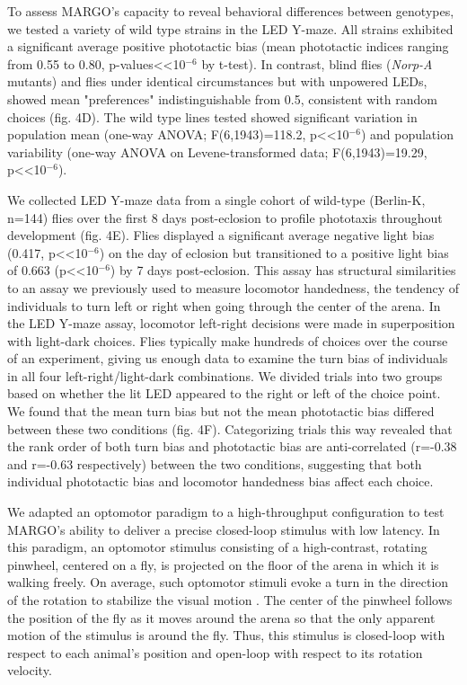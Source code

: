 \documentclass[10pt]{article}
\begin{document}
\begin{multicols}{2}
To assess MARGO's capacity to reveal behavioral differences between genotypes, we tested a variety of wild type strains in the LED Y-maze. All strains exhibited a significant average positive phototactic bias (mean phototactic indices ranging from 0.55 to 0.80, p-values<<10$^{-6}$ by t-test). In contrast, blind flies (\emph{Norp-A} mutants) and flies under identical circumstances but with unpowered LEDs, showed mean "preferences" indistinguishable from 0.5, consistent with random choices (fig. 4D). The wild type lines tested showed significant variation in population mean (one-way ANOVA; F(6,1943)=118.2, p<<10$^{-6}$) and population variability (one-way ANOVA on Levene-transformed data; F(6,1943)=19.29, p<<10$^{-6}$).

We collected LED Y-maze data from a single cohort of wild-type (Berlin-K, n=144) flies over the first 8 days post-eclosion to profile phototaxis throughout development (fig. 4E). Flies displayed a significant average negative light bias (0.417, p<<10$^{-6}$) on the day of eclosion but transitioned to a positive light bias of 0.663 (p<<10$^{-6}$) by 7 days post-eclosion. This assay has structural similarities to an assay we previously used to measure locomotor handedness\cite{Buchanan_Neuronal_2015}, the tendency of individuals to turn left or right when going through the center of the arena. In the LED Y-maze assay, locomotor left-right decisions were made in superposition with light-dark choices. Flies typically make hundreds of choices over the course of an experiment, giving us enough data to examine the turn bias of individuals in all four left-right/light-dark combinations. We divided trials into two groups based on whether the lit LED appeared to the right or left of the choice point. We found that the mean turn bias but not the mean phototactic bias differed between these two conditions (fig. 4F)\cite{Ayroles_Behavioral_2015}. Categorizing trials this way revealed that the rank order of both turn bias and phototactic bias are anti-correlated (r=-0.38 and r=-0.63 respectively) between the two conditions, suggesting that both individual phototactic bias and locomotor handedness bias affect each choice. 

We adapted an optomotor paradigm\cite{Cruz572792} to a high-throughput configuration to test MARGO's ability to deliver a precise closed-loop stimulus with low latency. In this paradigm, an optomotor stimulus consisting of a high-contrast, rotating pinwheel, centered on a fly, is projected on the floor of the arena in which it is walking freely. On average, such optomotor stimuli evoke a turn in the direction of the rotation to stabilize the visual motion \cite{Gtz_Visual_1973}. The center of the pinwheel follows the position of the fly as it moves around the arena so that the only apparent motion of the stimulus is around the fly. Thus, this stimulus is closed-loop with respect to each animal's position and open-loop with respect to its rotation velocity.


\end{multicols}
\end{document}
